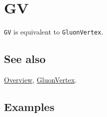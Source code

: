 \documentclass[../FeynCalcManual.tex]{subfiles}
\begin{document}
\hypertarget{gv}{
\section{GV}\label{gv}}

\texttt{GV} is equivalent to \texttt{GluonVertex}.

\subsection{See also}

\hyperlink{toc}{Overview}, \hyperlink{gluonvertex}{GluonVertex}.

\subsection{Examples}
\end{document}
